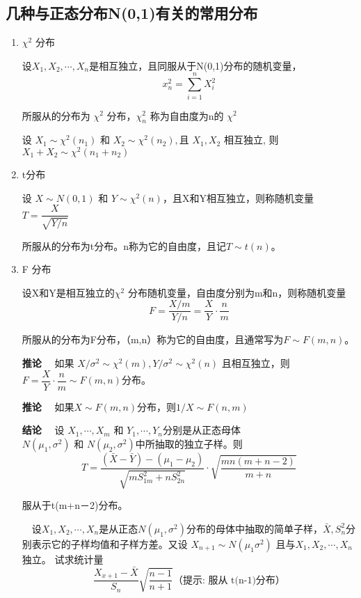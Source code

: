 \subsection{几种与正态分布N(0,1)有关的常用分布}
	\begin{enumerate}[1)]
		\item $ \chi ^2 $ 分布
			\begin{mydef}
				设$ X_1, X_2 , \cdots ,X_n $是相互独立，且同服从于N(0,1)分布的随机变量，
				\vspace{-1em}
				$$ x_{n}^{2}=\sum_{i=1}^{n} X_{i}^{2} $$
				
				所服从的分布为 $ \chi ^2 $ 分布，$ \chi_{n}^{2} $ 称为自由度为n的 $ \chi ^2 $ 
	        \end{mydef} 
			\begin{theorem}
				设  $ X_{1} \sim \chi^{2}\left(n_{1}\right) $  和 $  X_{2} \sim \chi^{2}\left(n_{2}\right), $且 $ X_{1}, X_{2} $  相互独立, 则 $ X_{1}+X_{2} \sim \chi^{2}\left(n_{1}+n_{2}\right) $
			\end{theorem}
	\item t分布
	
		设 $ X \sim N(0,1) \text { 和 } Y \sim \chi^{2}(n) $，且X和Y相互独立，则称随机变量 $ T=\dfrac{X}{\sqrt{Y / n}} $
		
		所服从的分布为t分布。n称为它的自由度，且记$ T \sim t(n) $。
	\item F 分布
	
		\begin{mydef}
			
			设X和Y是相互独立的$ \chi ^2 $ 分布随机变量，自由度分别为m和n，则称随机变量
			$$ F=\frac{X / m}{Y / n}=\frac{X}{Y} \cdot \frac{n}{m} $$	
			
			所服从的分布为F分布，（m,n）称为它的自由度，且通常写为$ F \sim F(m,n) $。
		\end{mydef}
		{\bf 推论} \ \ 如果 $ X / \sigma^{2} \sim \chi^{2}(m), Y / \sigma^{2} \sim \chi^{2}(n) $ 且相互独立，则 
		$ F=\dfrac{X}{Y} \cdot \dfrac{n}{m} \sim F(m, n) $分布。
		
		{\bf 推论} \ \ 如果$ X \sim F(m,n) $分布，则$ 1/X \sim F(n,m)   $
		
		{\bf 结论} \ \ 设 $ X_{1}, \cdots, X_{m} \text { 和 } Y_{1}, \cdots, Y_{n} $分别是从正态母体
		$ N\left(\mu_{1}, \sigma^{2}\right) \text { 和 } N\left(\mu_{2}, \sigma^{2}\right) $中所抽取的独立子样。则
		$$ T=\dfrac{(\bar{X}-\bar{Y})-\left(\mu_{1}-\mu_{2}\right)}{\sqrt{m S_{1 m}^{2}+n S_{2 n}^{2}}} \cdot \sqrt{\dfrac{m n(m+n-2)}{m+n}} $$
		
		服从于t(m+n－2)分布。
		
		\begin{myexample}[练习] 
			\ \ 设$ X_1, X_2 , \cdots ,X_n $是从正态$ N\left(\mu_{1}, \sigma^{2}\right) $分布的母体中抽取的简单子样，$  \bar{X} , S_{n} ^2 $分别表示它的子样均值和子样方差。又设
			$X_{n+1} \sim  N\left(\mu_{1} \sigma^{2}\right) $ 且与$ X_1, X_2 , \cdots ,X_n $独立。 试求统计量
			$$  \dfrac{X_{x+1}-\bar{X}}{S_{n}} \sqrt{\dfrac{n-1}{n+1}} \text{（提示: 服从 t(n-1)分布）} $$
		\end{myexample}
	\end{enumerate}

